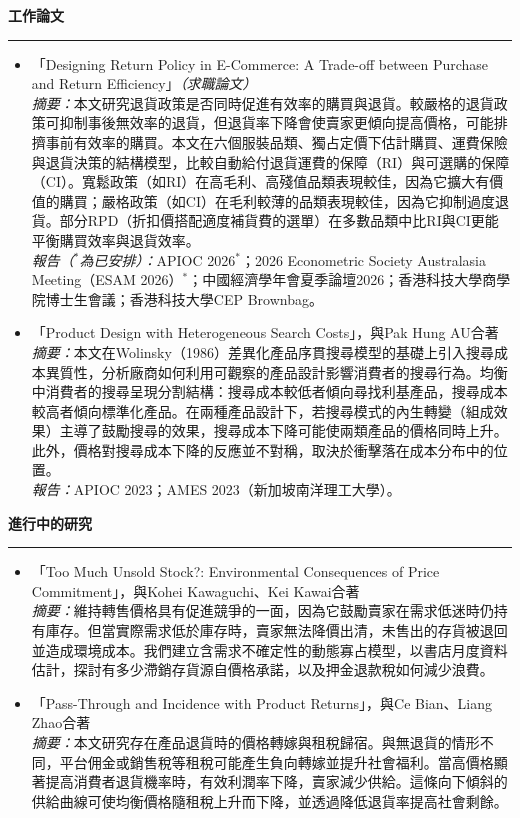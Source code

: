 \documentclass[11pt,letterpaper]{article}
\newcommand{\sectionheader}[1]{%
  \vspace{0.55em}
  {\large\bfseries #1}\\[-0.15em]
  \rule{\textwidth}{0.4pt}\par
  \vspace{0.25em}
}
\begin{document}
\vspace{-0.55em}
\sectionheader{工作論文}
\begin{itemize}
  \item 「Designing Return Policy in E-Commerce: A Trade-off between Purchase and Return Efficiency」\textit{（求職論文）}\\[0.2em]
  \textit{摘要：}本文研究退貨政策是否同時促進有效率的購買與退貨。較嚴格的退貨政策可抑制事後無效率的退貨，但退貨率下降會使賣家更傾向提高價格，可能排擠事前有效率的購買。本文在六個服裝品類、獨占定價下估計購買、運費保險與退貨決策的結構模型，比較自動給付退貨運費的保障（RI）與可選購的保障（CI）。寬鬆政策（如RI）在高毛利、高殘值品類表現較佳，因為它擴大有價值的購買；嚴格政策（如CI）在毛利較薄的品類表現較佳，因為它抑制過度退貨。部分RPD（折扣價搭配適度補貨費的選單）在多數品類中比RI與CI更能平衡購買效率與退貨效率。\\[0.2em]
  \textit{報告（$^{\ast}$為已安排）：}APIOC 2026$^{\ast}$；2026 Econometric Society Australasia Meeting（ESAM 2026）$^{\ast}$；中國經濟學年會夏季論壇2026；香港科技大學商學院博士生會議；香港科技大學CEP Brownbag。

  \item 「Product Design with Heterogeneous Search Costs」，與Pak Hung AU合著\\[0.2em]
  \textit{摘要：}本文在Wolinsky（1986）差異化產品序貫搜尋模型的基礎上引入搜尋成本異質性，分析廠商如何利用可觀察的產品設計影響消費者的搜尋行為。均衡中消費者的搜尋呈現分割結構：搜尋成本較低者傾向尋找利基產品，搜尋成本較高者傾向標準化產品。在兩種產品設計下，若搜尋模式的內生轉變（組成效果）主導了鼓勵搜尋的效果，搜尋成本下降可能使兩類產品的價格同時上升。此外，價格對搜尋成本下降的反應並不對稱，取決於衝擊落在成本分布中的位置。\\[0.2em]
  \textit{報告：}APIOC 2023；AMES 2023（新加坡南洋理工大學）。
\end{itemize}

\sectionheader{進行中的研究}
\begin{itemize}
  \item 「Too Much Unsold Stock?: Environmental Consequences of Price Commitment」，與Kohei Kawaguchi、Kei Kawai合著\\[0.2em]
  \textit{摘要：}維持轉售價格具有促進競爭的一面，因為它鼓勵賣家在需求低迷時仍持有庫存。但當實際需求低於庫存時，賣家無法降價出清，未售出的存貨被退回並造成環境成本。我們建立含需求不確定性的動態寡占模型，以書店月度資料估計，探討有多少滯銷存貨源自價格承諾，以及押金退款稅如何減少浪費。
  \item 「Pass-Through and Incidence with Product Returns」，與Ce Bian、Liang Zhao合著\\[0.2em]
  \textit{摘要：}本文研究存在產品退貨時的價格轉嫁與租稅歸宿。與無退貨的情形不同，平台佣金或銷售稅等租稅可能產生負向轉嫁並提升社會福利。當高價格顯著提高消費者退貨機率時，有效利潤率下降，賣家減少供給。這條向下傾斜的供給曲線可使均衡價格隨租稅上升而下降，並透過降低退貨率提高社會剩餘。
\end{itemize}
\end{document}
